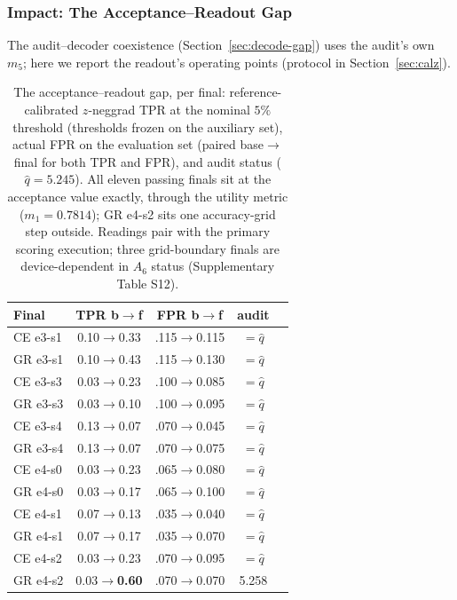 \documentclass[lettersize,journal]{IEEEtran}
\begin{document}
\subsubsection{Impact: The Acceptance--Readout Gap}
\label{sec:zreadout}
The audit--decoder coexistence (Section~\ref{sec:decode-gap})
uses the audit's own $m_5$; here we report the readout's
operating points (protocol in Section~\ref{sec:calz}).

\begin{table}[t]
\caption{The acceptance--readout gap, per final:
reference-calibrated $z$-neggrad TPR at the nominal $5\%$
threshold (thresholds frozen on the auxiliary set), actual
FPR on the evaluation set (paired base$\to$final for both TPR
and FPR), and audit status ($\hat
q{=}5.245$). All eleven passing finals sit at the acceptance
value exactly, through the utility metric ($m_1{=}0.7814$);
GR e4-s2 sits one accuracy-grid step outside. Readings pair
with the primary scoring execution; three grid-boundary
finals are device-dependent in $A_6$ status (Supplementary
Table S12).}
\label{tab:zreadout}
\centering
\small
\setlength{\tabcolsep}{3pt}
\begin{tabular}{lcccc}
\toprule
Final & TPR b$\to$f & FPR b$\to$f & audit \\
\midrule
CE e3-s1 & 0.10$\to$0.33 & .115$\to$0.115 & $=\hat q$ \\
GR e3-s1 & 0.10$\to$0.43 & .115$\to$0.130 & $=\hat q$ \\
CE e3-s3 & 0.03$\to$0.23 & .100$\to$0.085 & $=\hat q$ \\
GR e3-s3 & 0.03$\to$0.10 & .100$\to$0.095 & $=\hat q$ \\
CE e3-s4 & 0.13$\to$0.07 & .070$\to$0.045 & $=\hat q$ \\
GR e3-s4 & 0.13$\to$0.07 & .070$\to$0.075 & $=\hat q$ \\
CE e4-s0 & 0.03$\to$0.23 & .065$\to$0.080 & $=\hat q$ \\
GR e4-s0 & 0.03$\to$0.17 & .065$\to$0.100 & $=\hat q$ \\
CE e4-s1 & 0.07$\to$0.13 & .035$\to$0.040 & $=\hat q$ \\
GR e4-s1 & 0.07$\to$0.17 & .035$\to$0.070 & $=\hat q$ \\
CE e4-s2 & 0.03$\to$0.23 & .070$\to$0.095 & $=\hat q$ \\
GR e4-s2 & 0.03$\to$\textbf{0.60} & .070$\to$0.070 & 5.258 \\
\bottomrule
\end{tabular}
\end{table}
\end{document}

